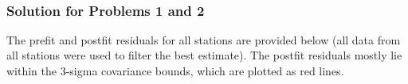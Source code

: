 \documentclass[conf]{new-aiaa}
\begin{document}
\begin{center}
	 \\
\end{center}


\subsubsection*{Solution for Problems 1 and 2} 

The prefit and postfit residuals for all stations are provided below (all data from all stations were used to filter the best estimate). The postfit residuals mostly lie within the 3-sigma covariance bounds, which are plotted as red lines. 
\end{document}

